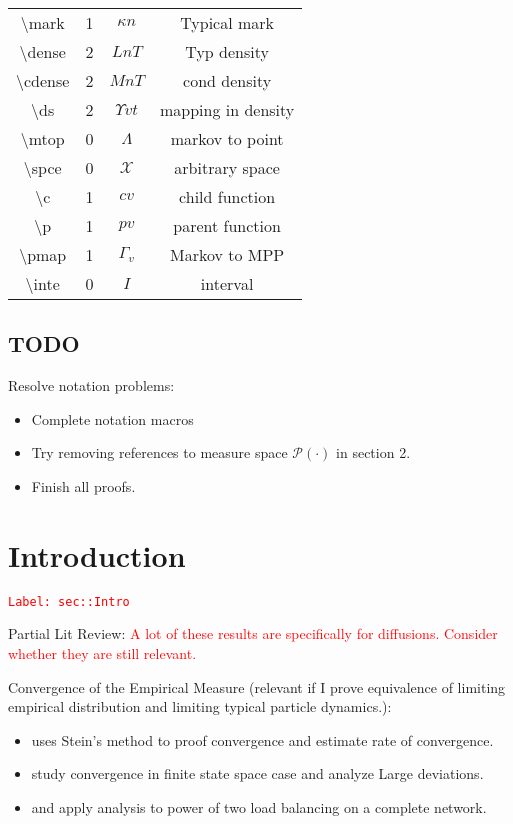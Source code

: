 \documentclass[12pt]{article}
\newcommand{\mc}{\mathcal}
\newcommand{\tr}{\textcolor{red}}
\newcommand{\labe}[1]{\tr{\texttt{Label: #1}}}
\newcommand{\tbs}{\textbackslash}
\newcommand{\pmsr}{\mc{P}}							%
\renewcommand{\v}{v}							%
\newcommand{\T}{T}								%
\renewcommand{\t}{t}							%
\newcommand{\pmap}[1]{\Gamma_{#1}}				%
\renewcommand{\mark}{\kappa}					%
\newcommand{\dense}{L}							%
\newcommand{\cdense}{M}							%
\newcommand{\ds}{\Upsilon}						%
\renewcommand{\c}{c}							%
\newcommand{\p}{p}								%
\newcommand{\mtop}{\Lambda}						%
\newcommand{\spce}{\mc{X}}						%
\newcommand{\inte}{I}							%
\begin{document}
\begin{longtable}{c|c|c|c}
\tbs mark&1&\(\mark{n}\)				&Typical mark\\
\tbs dense&2& \(\dense{n}{\T}\)			&Typ density\\
\tbs cdense&2&\(\cdense{n}{\T}\)		&cond density\\
\tbs ds&2& \(\ds{\v}{\t}\)					&mapping in density\\
\tbs mtop &0& \(\mtop\)						&markov to point\\
\tbs spce &0&\(\spce\)						&arbitrary space\\
\tbs c &1& \(\c{\v}\)						&child function\\
\tbs p &1& \(\p{\v}\)						&parent function \\
\tbs pmap &1& \(\pmap{\v}\)					&Markov to MPP\\
\tbs inte &0& \(\inte\)						&interval
\end{longtable}

\subsection*{TODO}

Resolve notation problems:

\begin{itemize}
\item Complete notation macros

\item Try removing references to measure space \(\pmsr(\cdot)\) in section 2.

\item Finish all proofs.
\end{itemize}

\section{Introduction}
\label{sec::Intro}\labe{sec::Intro}

Partial Lit Review: \tr{A lot of these results are specifically for diffusions. Consider whether they are still relevant.}

Convergence of the Empirical Measure (relevant if I prove equivalence of limiting empirical distribution and limiting typical particle dynamics.):

\begin{itemize}
\item \cite{Yin15} uses Stein's method to proof convergence and estimate rate of convergence.

\item \cite{DupRamWu16} study convergence in finite state space case and analyze Large deviations.

\item \cite{VveDobKar96} and \cite{Mit01} apply analysis to power of two load balancing on a complete network. 
\end{itemize}
\end{document}
